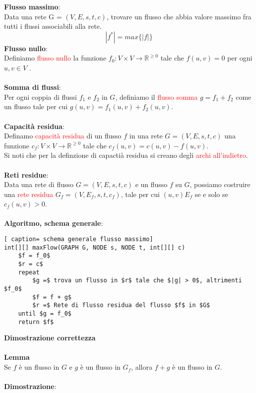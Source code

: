 \documentclass[../cheatSheetAlgoritmi.tex]{subfiles}
\begin{document}
\textbf{Flusso massimo}:\\
Data una rete G = $(V, E, s, t, c)$, trovare un flusso che abbia valore massimo fra tutti i flussi associabili alla rete.
\begin{equation*}
	|f^{*}| = max\{|f|\}
\end{equation*}
\textbf{Flusso nullo}:\\
Definiamo \textcolor{red}{flusso nullo} la funzione $f_{0} : V \times V \rightarrow \mathbb{R}^{\geq 0}$ tale che $f(u, v) = 0$ per ogni $u, v \in V$ . \\\\
\textbf{Somma di flussi}:\\
Per ogni coppia di flussi $f_1$ e $f_2$ in $G$, definiamo il \textcolor{red}{flusso somma} $g = f_1 + f_2$ come un flusso tale per cui $g(u, v) = f_1(u, v) + f_2(u, v)$. \\\\
\textbf{Capacità residua}:\\
Definamo \textcolor{red}{capacità residua} di un flusso $f$ in una rete $G = (V, E, s, t, c)$ una funzione $c_f : V \times V \rightarrow \mathbb{R}^{\geq 0}$ tale che $c_f(u, v) = c(u, v) - f(u, v)$. \\
Si noti che per la definzione di capactià residua si creano degli \textcolor{red}{archi all'indietro}. \\\\
\textbf{Reti residue}:\\
Data una rete di flusso $G = (V, E, s, t, c)$ e un flusso $f$ su $G$, possiamo costruire una \textcolor{red}{rete residua} $G_f = (V, E_f, s, t, c_f)$, tale per cui $(u, v) E_f$ se e solo se $c_f(u, v) > 0$. \\\\
\textbf{Algoritmo, schema generale}:
 \begin{lstlisting}[ caption= schema generale flusso massimo]
int[][] maxFlow(GRAPH G, NODE s, NODE t, int[][] c)
	$f = f_0$
	$r = c$
	repeat 
		$g =$ trova un flusso in $r$ tale che $|g| > 0$, altrimenti $f_0$
		$f = f + g$
		$r =$ Rete di flusso residua del flusso $f$ in $G$
	until $g = f_0$ 
	return $f$
\end{lstlisting}
\textbf{Dimostrazione correttezza} \\\\
\textbf{Lemma}\\
Se $f$ è un flusso in $G$ e $g$ è un flusso in $G_f$, allora $f+g$ è un flusso in $G$. \\\\
\textbf{Dimostrazione}:
\end{document}
